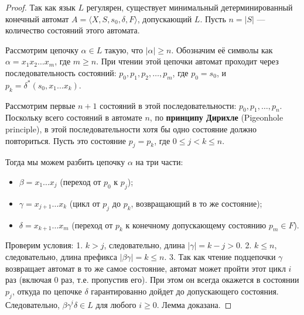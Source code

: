 \documentclass[12pt,a4paper]{article}
\theoremstyle{definition}
\theoremstyle{plain}
\theoremstyle{remark}
\begin{document}
\begin{proof}
Так как язык $L$ регулярен, существует минимальный детерминированный конечный автомат $A = \langle X, S, s_0, \delta, F \rangle$, допускающий $L$. Пусть $n = |S|$ — количество состояний этого автомата.

Рассмотрим цепочку $\alpha \in L$ такую, что $|\alpha| \ge n$. Обозначим её символы как $\alpha = x_1 x_2 \dots x_m$, где $m \ge n$. При чтении этой цепочки автомат проходит через последовательность состояний:
$p_0, p_1, p_2, \dots, p_m$,
где $p_0 = s_0$, и $p_k = \delta^*(s_0, x_1\dots x_k)$.

Рассмотрим первые $n+1$ состояний в этой последовательности: $p_0, p_1, \dots, p_n$. Поскольку всего состояний в автомате $n$, по \textbf{принципу Дирихле} (Pigeonhole principle), в этой последовательности хотя бы одно состояние должно повториться. Пусть это состояние $p_j = p_k$, где $0 \le j < k \le n$.

Тогда мы можем разбить цепочку $\alpha$ на три части:
\begin{itemize}
    \item $\beta = x_1 \dots x_j$ (переход от $p_0$ к $p_j$);
    \item $\gamma = x_{j+1} \dots x_k$ (цикл от $p_j$ до $p_k$, возвращающий в то же состояние);
    \item $\delta = x_{k+1} \dots x_m$ (переход от $p_k$ к конечному допускающему состоянию $p_m \in F$).
\end{itemize}
Проверим условия:
1. $k > j$, следовательно, длина $|\gamma| = k - j > 0$.
2. $k \le n$, следовательно, длина префикса $|\beta\gamma| = k \le n$.
3. Так как чтение подцепочки $\gamma$ возвращает автомат в то же самое состояние, автомат может пройти этот цикл $i$ раз (включая $0$ раз, т.е. пропустив его). При этом он всегда окажется в состоянии $p_j$, откуда по цепочке $\delta$ гарантированно дойдет до допускающего состояния. Следовательно, $\beta\gamma^i\delta \in L$ для любого $i \ge 0$. Лемма доказана.
\end{proof}
\end{document}
